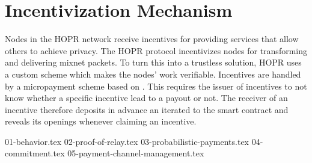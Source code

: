 \section{Incentivization Mechanism}
\label{sec:incentives}

Nodes in the HOPR network receive incentives for providing services that allow others to achieve privacy. The HOPR protocol incentivizes nodes for transforming and delivering mixnet packets. To turn this into a trustless solution, HOPR uses a custom  scheme which makes the nodes' work verifiable. Incentives are handled by a micropayment scheme based on . This requires the issuer of incentives to not know whether a specific incentive lead to a payout or not. The receiver of an incentive therefore deposits in advance an iterated  to the smart contract and reveals its openings whenever claiming an incentive.

{01-behavior.tex}
{02-proof-of-relay.tex}
{03-probabilistic-payments.tex}
{04-commitment.tex}
{05-payment-channel-management.tex}
